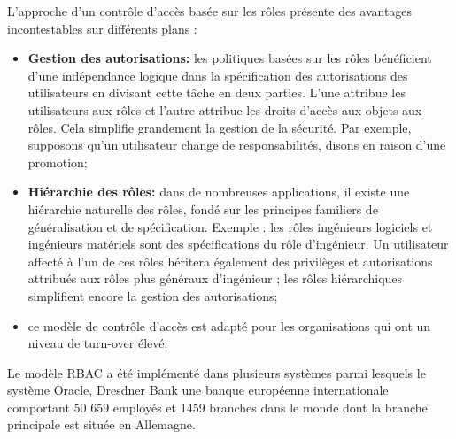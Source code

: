 \label{sectionAvantageRBAC}

L'approche d'un contrôle d'accès basée sur les rôles présente des avantages incontestables sur différents plans \cite{theseBenoit}:

\begin{itemize}
\item \textbf{Gestion des autorisations:} les politiques basées sur les rôles bénéficient d'une indépendance logique dans la spécification des autorisations des utilisateurs en divisant cette tâche en deux parties. L'une attribue les utilisateurs aux rôles et l'autre attribue les droits d'accès aux objets aux rôles. Cela simplifie grandement la gestion de la sécurité. Par exemple, supposons qu'un utilisateur change de responsabilités, disons en raison d'une promotion;
\item \textbf{Hiérarchie des rôles:} dans de nombreuses applications, il existe une hiérarchie naturelle des rôles, fondé sur les principes familiers de généralisation et de spécification. Exemple : les rôles ingénieurs logiciels et ingénieurs matériels sont des spécifications du rôle d'ingénieur. Un utilisateur affecté à l'un de ces rôles héritera également des privilèges et autorisations attribués aux rôles plus généraux d'ingénieur ; les rôles hiérarchiques simplifient encore la gestion des autorisations;
\item ce modèle de contrôle d'accès est adapté pour les organisations qui ont un niveau de turn-over élevé.
\end{itemize}
\hspace*{0.5cm} Le modèle RBAC a été implémenté dans plusieurs systèmes parmi lesquels le système Oracle, Dresdner Bank une banque européenne internationale comportant 50 659 employés et 1459 branches dans le monde dont la branche principale est située en Allemagne.

\label{sectionInconvéniantRBAC}

